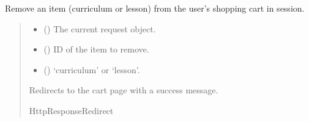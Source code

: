 \documentclass[letterpaper,10pt,english]{sphinxmanual}
\begin{document}
\begin{fulllineitems}
\label{\detokenize{cart:cart.views.remove_from_cart}}
\pysigstartsignatures
\pysiglinewithargsret
{}
{\sphinxparamcomma {}\sphinxparamcomma {}}
{}
\pysigstopsignatures
\sphinxAtStartPar
Remove an item (curriculum or lesson) from the user’s shopping cart in session.
\begin{quote}\begin{description}
\begin{itemize}
\item {} 
\sphinxAtStartPar
{} () \textendash{} The current request object.

\item {} 
\sphinxAtStartPar
{} () \textendash{} ID of the item to remove.

\item {} 
\sphinxAtStartPar
{} () \textendash{} ‘curriculum’ or ‘lesson’.

\end{itemize}

\sphinxAtStartPar
Redirects to the cart page with a success message.

\sphinxAtStartPar
HttpResponseRedirect

\end{description}\end{quote}

\end{fulllineitems}

\end{document}
